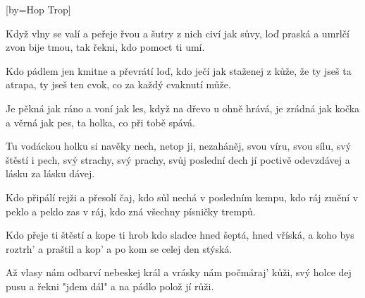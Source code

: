 [by={Hop Trop}]

\beginverse{}
Když vlny se valí a peřeje řvou
a šutry z nich civí jak sůvy,
loď praská a umrlčí zvon bije tmou,
tak řekni, kdo pomoct ti umí.
\endverse{}

\beginverse*{}
Kdo pádlem jen kmitne a převrátí loď,
kdo ječí jak staženej z kůže,
že ty jseš ta atrapa, ty jseš ten cvok,
co za každý cvaknutí může.
\endverse{}

\beginverse{}
Je pěkná jak ráno a voní jak les,
když na dřevo u ohně hrává,
je zrádná jak kočka a věrná jak pes,
ta holka, co při tobě spává.
\endverse{}

\beginchorus{}
Tu vodáckou holku si navěky nech,
netop ji, nezaháněj,
svou víru, svou sílu, svý štěstí i pech,
svý strachy, svý prachy, svůj poslední dech
jí poctivě odevzdávej
a lásku za lásku dávej.
\endchorus{}

\beginverse{}
Kdo připálí rejži a přesolí čaj,
kdo sůl nechá v posledním kempu,
kdo ráj změní v peklo a peklo zas v ráj,
kdo zná všechny písničky trempů.
\endverse{}

\beginverse*{}
Kdo přeje ti štěstí a kope ti hrob
kdo sladce hned šeptá, hned vříská,
a koho bys roztrh' a praštil a kop'
a po kom se celej den stýská.
\endverse{}

\beginverse{}
Až vlasy nám odbarví nebeskej král
a vrásky nám počmáraj' kůži,
svý holce dej pusu a řekni "jdem dál"
a na pádlo polož jí růži.
\endverse{}

\beginchorus{}
\phantom{}
\endchorus{}

\endsong{}
